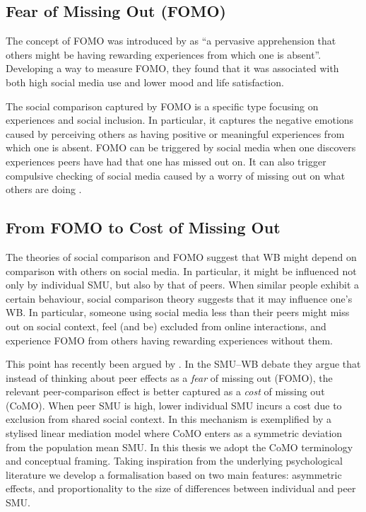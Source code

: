 \subsection{Fear of Missing Out (FOMO)}

The concept of FOMO was introduced by \textcite[p.~1841]{Przybylski2013} as ``a pervasive apprehension that others might be having rewarding experiences from which one is absent''. Developing a way to measure FOMO, they found that it was associated with both high social media use and lower mood and life satisfaction.

The social comparison captured by FOMO is a specific type focusing on experiences and social inclusion. In particular, it captures the negative emotions caused by perceiving others as having positive or meaningful experiences from which one is absent. FOMO can be triggered by social media when one discovers experiences peers have had that one has missed out on. It can also trigger compulsive checking of social media caused by a worry of missing out on what others are doing \parencite[p.~1846]{Przybylski2013}.

\subsection{From FOMO to Cost of Missing Out}

The theories of social comparison and FOMO suggest that WB might depend on comparison with others on social media. In particular, it might be influenced not only by individual SMU, but also by that of peers. When similar people exhibit a certain behaviour, social comparison theory suggests that it may influence one's WB\@. In particular, someone using social media less than their peers might miss out on social context, feel (and be) excluded from online interactions, and experience FOMO from others having rewarding experiences without them.

This point has recently been argued by \textcite{DahlFoldnesGronneberg2024}. In the SMU--WB debate they argue that instead of thinking about peer effects as a \emph{fear} of missing out (FOMO), the relevant peer-comparison effect is better captured as a \emph{cost} of missing out (CoMO). When peer SMU is high, lower individual SMU incurs a cost due to exclusion from shared social context. In \textcite[Eqs.~1--2]{DahlFoldnesGronneberg2024} this mechanism is exemplified by a stylised linear mediation model where CoMO enters as a symmetric deviation from the population mean SMU\@. In this thesis we adopt the CoMO terminology and conceptual framing. Taking inspiration from the underlying psychological literature we develop a formalisation based on two main features: asymmetric effects, and proportionality to the size of differences between individual and peer SMU\@.

